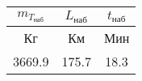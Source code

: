 \begin{tabular}{|c|c|c|}
\hline
$m_{T_{наб}}$ & $L_{наб}$ & $t_{наб}$ \\ 
\hline
Кг & Км & Мин \\ 
\hline
3669.9 & 175.7 & 18.3 \\ 
\hline
\end{tabular}